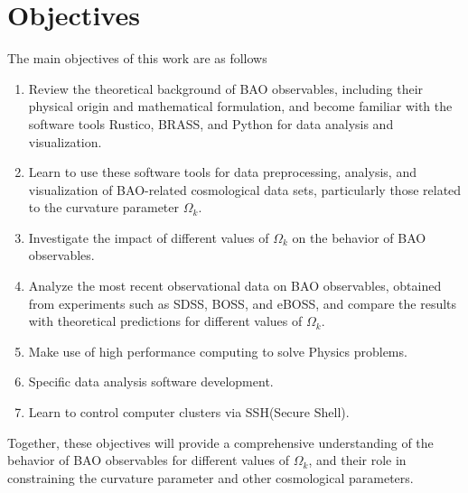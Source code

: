 \chapter{Objectives}
\label{cha:objectives}
The main objectives of this work are as follows

\begin{enumerate}
  \item Review the theoretical background of BAO observables, including their physical origin and mathematical formulation, and become familiar with the software tools Rustico, BRASS, and Python for data analysis and visualization.
  \item Learn to use these software tools for data preprocessing, analysis, and visualization of BAO-related cosmological data sets, particularly those related to the curvature parameter $\Omega_k$.
  \item Investigate the impact of different values of $\Omega_k$ on the behavior of BAO observables.
  \item Analyze the most recent observational data on BAO observables, obtained from experiments such as SDSS, BOSS, and eBOSS, and compare the results with theoretical predictions for different values of $\Omega_k$.
	\item Make use of high performance computing to solve Physics problems.
  \item Specific data analysis software development.
  \item Learn to control computer clusters via SSH(Secure Shell).
\end{enumerate}
Together, these objectives will provide a comprehensive understanding of the behavior of BAO observables for different values of $\Omega_k$, and their role in constraining the curvature parameter and other cosmological parameters.




